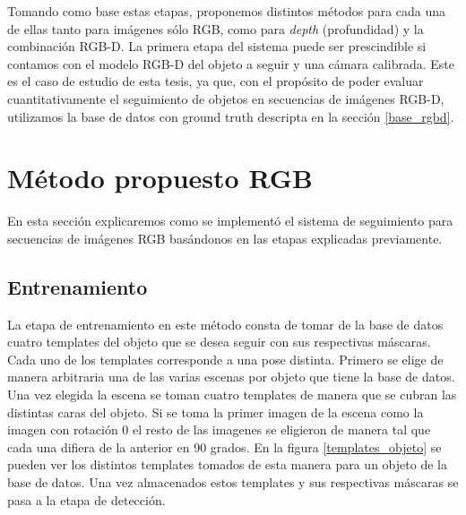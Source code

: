 Tomando como base estas etapas, proponemos distintos métodos para cada una de ellas tanto para imágenes sólo RGB, como para \textit{depth} (profundidad) y la combinación RGB-D. La primera etapa del sistema puede ser prescindible si contamos con el modelo RGB-D del objeto a seguir y una cámara calibrada. Este es el caso de estudio de esta tesis, ya que, con el propósito de poder evaluar cuantitativamente el seguimiento de objetos en secuencias de imágenes RGB-D, utilizamos la base de datos con ground truth descripta en la sección \ref{base_rgbd}.

\section{Método propuesto RGB}\label{metodo_rgb}
En esta sección explicaremos como se implementó el sistema de seguimiento para secuencias de imágenes RGB basándonos en las etapas explicadas previamente.

\subsection{Entrenamiento}
La etapa de entrenamiento en este método consta de tomar de la base de datos cuatro templates del objeto que se desea seguir con sus respectivas máscaras. Cada uno de los templates corresponde a una pose distinta. Primero se elige de manera arbitraria una de las varias escenas por objeto que tiene la base de datos. Una vez elegida la escena se toman cuatro templates de manera que se cubran las distintas caras del objeto. Si se toma la primer imagen de la escena como la imagen con rotación 0 el resto de las imagenes se eligieron de manera tal que cada una difiera de la anterior en 90 grados. En la figura \ref{templates_objeto} se pueden ver los distintos templates tomados de esta manera para un objeto de la base de datos. Una vez almacenados estos templates y sus respectivas máscaras se pasa a la etapa de detección.

